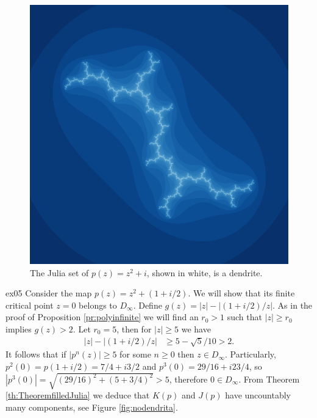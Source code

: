 \begin{figure}[h!]
	\centering  
  \includegraphics[scale=.4]{dendrita}
  \caption{The Julia set of $p(z) = z^2+i$, shown in white, is a dendrite.}
  \label{fig:dendrita}
\end{figure}

\begin{myexmp}[breakable]{}{ex05}
Consider the map $p(z)=z^2+(1+i/2)$. We will show that its finite critical point $z=0$ belongs to $D_\infty$. Define $g(z) = |z|-|(1+i/2)/z|$. As in the proof of Proposition \ref{pr:polyinfinite} we will find an $r_0>1$ such that $|z|\geq r_0$ implies $g(z)>2$. Let $r_0=5$, then for $|z|\geq 5$ we have
\begin{align*}
|z|-|(1+i/2)/z| &\geq 5 - \sqrt{5}/10>2.
\end{align*}
It follows that if $|p^n(z)|\geq 5$ for some $n\geq 0$ then $z\in D_\infty$. Particularly, $p^2(0) = p(1+i/2) = 7/4+i3/2$ and $p^3(0) = 29/16 + i 23/4$, so $|p^3(0)| = \sqrt{(29/16)^2+(5+3/4)^2}>5$, therefore $0\in D_\infty$. From Theorem \ref{th:TheoremfilledJulia} we deduce that $K(p)$ and $J(p)$ have uncountably many components, see Figure \ref{fig:nodendrita}. 
\end{myexmp}

